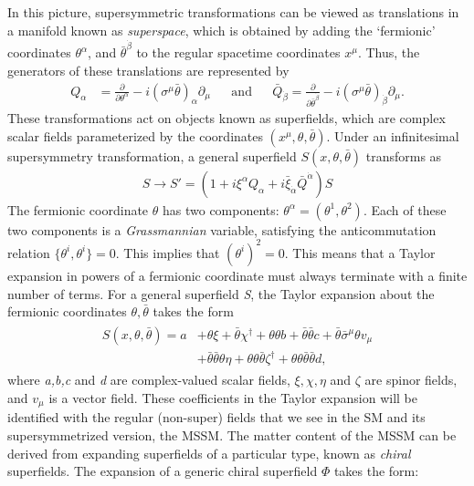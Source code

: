 In this picture, supersymmetric transformations can be viewed as translations in a manifold known as \emph{superspace}, which is obtained by adding the `fermionic' coordinates $\theta^\alpha$, and $\bar{\theta}^{\dot{\beta}}$ to the regular spacetime coordinates $x^\mu$. 
Thus, the generators of these translations are represented by
\begin{align}
  Q_\alpha &= \frac{\partial}{\partial\theta^\alpha}-i(\sigma^\mu \bar{\theta})_\alpha \partial_\mu&&\text{and}&&
  \bar{Q}_{\dot{\beta}} = \frac{\partial}{\partial\bar{\theta}^{\dot{\beta}}}-i(\sigma^\mu\bar{\theta})_{\dot{\beta}}\partial_\mu.
\label{eq:susy_operators_diff_form}
\end{align}
These transformations act on objects known as superfields, which are complex scalar fields parameterized by the coordinates $(x^\mu,\theta,\bar{\theta})$.
Under an infinitesimal supersymmetry transformation, a general superfield $S(x,\theta,\bar{\theta})$ transforms as
\begin{align}
S\rightarrow S' = (1+i\xi^\alpha Q_\alpha + i\bar{\xi}_{\dot{\alpha}}\bar{Q}^{\dot{\alpha}})S
\label{eq:gen_susy_transformation}
\end{align}
The fermionic coordinate $\theta$ has two components: $\theta^\alpha = (\theta^1,\theta^2)$. Each of these two components is a \emph{Grassmannian} variable, satisfying the anticommutation relation $\{\theta^i,\theta^i\} = 0$. This implies that $(\theta^i)^2 = 0$. This means that a Taylor expansion in powers of a fermionic coordinate must always terminate with a finite number of terms. For a general superfield \emph{S}, the Taylor expansion about the fermionic coordinates $\theta,\bar{\theta}$ takes the form
\begin{align}
  \begin{split}
  S(x,\theta,\bar{\theta}) = a &+ \theta\xi + \bar{\theta}\chi^\dagger + \theta\theta b + \bar{\theta}\bar{\theta}c+\bar{\theta}\bar{\sigma}^\mu\theta v_\mu \\
  &+ \bar{\theta}\bar{\theta}\theta\eta + \theta\theta\bar{\theta}\zeta^\dagger+\theta\theta\bar{\theta}\bar{\theta}d,
\end{split}
  \label{eq:general_superfield_expansion}
\end{align}
where \emph{a,b,c} and \emph{d} are complex-valued scalar fields, $\xi,\chi,\eta$ and $\zeta$ are spinor fields, and $v_\mu$ is a vector field. These coefficients in the Taylor expansion will be identified with the regular (non-super) fields that we see in the SM and its supersymmetrized version, the MSSM. The matter content of the MSSM can be derived from expanding superfields of a particular type, known as \emph{chiral} superfields. The expansion of a generic chiral superfield $\Phi$ takes the form:
